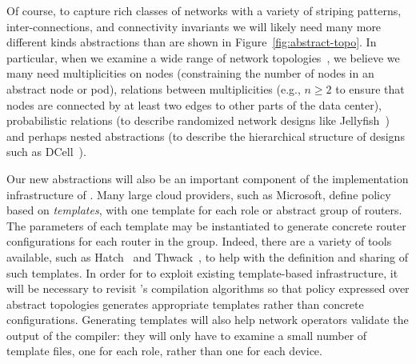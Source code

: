 Of course, to capture rich classes of networks with a variety of
striping patterns, inter-connections, and connectivity
invariants
we will likely need many more different kinds abstractions than are
shown in Figure~\ref{fig:abstract-topo}.  In particular, when we examine a wide range of network
topologies~\cite{al-fares:data-center-architecture,f10,quasi-fat-trees,aspen-trees,jellyfish,dcell}, 
we believe we many need multiplicities on nodes (constraining the
number of nodes in an abstract node or pod), relations between 
multiplicities (e.g., $n \geq 2$
to ensure that nodes are connected by at least two edges to other parts of the data center), probabilistic relations (to describe randomized network
designs like Jellyfish~\cite{jellyfish}) and perhaps nested abstractions (to describe the
hierarchical structure of designs such as DCell~\cite{dcell}).  

Our new abstractions will also be an important component of the implementation
infrastructure of \Name. 
Many large cloud providers, such as Microsoft, define policy based on
\emph{templates}, with one template for each role or abstract group of
routers.  The parameters of each template may be instantiated to generate
concrete router configurations for each router in the group.
Indeed, there are a variety of tools available, such as Hatch~\cite{hatch}
and Thwack~\cite{thwack},
to help with the definition and sharing of such templates.
In order for \Name to exploit existing template-based infrastructure,
it will be necessary to revisit \Propane's compilation algorithms so
that policy expressed over abstract topologies generates appropriate
templates rather than concrete configurations.  Generating templates will
also help network operators validate the output of the \Name compiler:
they will only have to examine a small number of template files, one for
each role, rather than one for each device.

